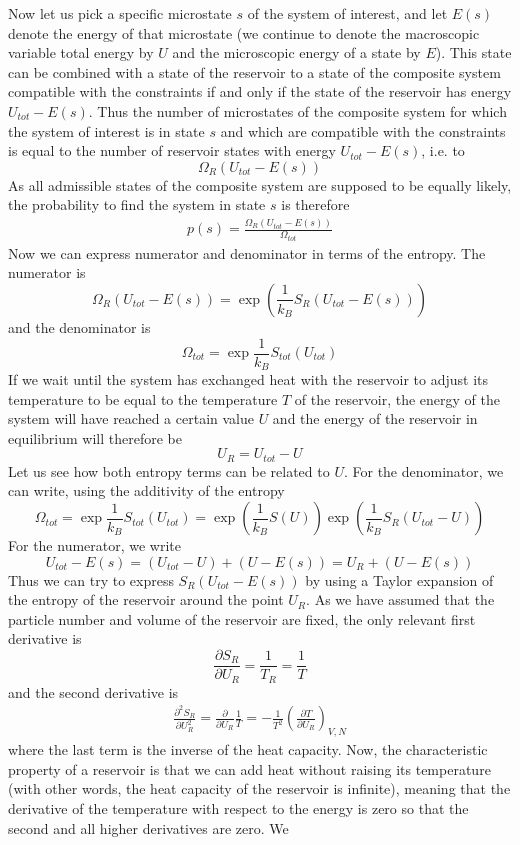 \documentclass[a4paper, draft]{article}
\theoremstyle{own}
\theoremstyle{remark}
\begin{document}
Now let us pick a specific microstate $s$ of the system of interest, and let $E(s)$ denote the energy of that microstate (we continue to denote the macroscopic variable total energy by $U$ and the microscopic energy of a state by $E$). This state can be combined with a state of the reservoir to  a state of the composite system compatible with the constraints if and only if the state of the reservoir has energy $U_{tot} - E(s)$. Thus the number of microstates of the composite system for which the system of interest is in state $s$ and which are compatible with the constraints is equal to the number of reservoir states with energy $U_{tot} - E(s)$, i.e. to
$$
\Omega_R(U_{tot} - E(s))
$$
As all admissible states of the composite system are supposed to be equally likely, the probability to find the system in state $s$ is therefore
\begin{align}\label{eq:probsubsystem}
p(s) = \frac{\Omega_R(U_{tot} - E(s))}{\Omega_{tot}}
\end{align}
Now we can express numerator and denominator in terms of the entropy. The numerator is
$$
\Omega_R(U_{tot} - E(s)) = \exp(\frac{1}{k_B} S_R(U_{tot} - E(s)))
$$
and the denominator is
$$
\Omega_{tot} = \exp \frac{1}{k_B} S_{tot}(U_{tot}) 
$$
If we wait until the system has exchanged heat with the reservoir to adjust its temperature to be equal to the temperature $T$ of the reservoir, the energy of the system will have reached a certain value $U$ and the energy of the reservoir in equilibrium will therefore be 
$$
U_R = U_{tot} - U
$$
Let us see how both entropy terms can be related to $U$. For the denominator, we can write, using the additivity of the entropy
$$
\Omega_{tot} = \exp \frac{1}{k_B} S_{tot}(U_{tot}) = \exp(\frac{1}{k_B} S(U)) \exp(\frac{1}{k_B} S_R(U_{tot} - U))
$$
For the numerator, we write
$$
U_{tot} - E(s) = (U_{tot} - U) + (U - E(s)) =  U_R + (U - E(s))
$$
Thus we can try to express $S_R(U_{tot} - E(s))$ by 
using a Taylor expansion of the entropy of the reservoir around the point $U_R$. As we have assumed that the particle number and volume of the reservoir are fixed, the only relevant first derivative is
$$
\frac{\partial S_R}{\partial U_R} = \frac{1}{T_R} = \frac{1}{T}
$$
and the second derivative is
\begin{align*}
\frac{\partial^2 S_R}{\partial U_R^2} = \frac{\partial}{\partial U_R} \frac{1}{T} 
= - \frac{1}{T^2} (\frac{\partial T}{\partial U_R})_{V,N} 
\end{align*}
where the last term is the inverse of the heat capacity. Now, the characteristic property of a reservoir is that we can add heat without raising its temperature (with other words, the heat capacity of the reservoir is infinite), meaning that the derivative of the temperature with respect to the energy is zero so that the second and all higher derivatives are zero. We 
\end{document}
